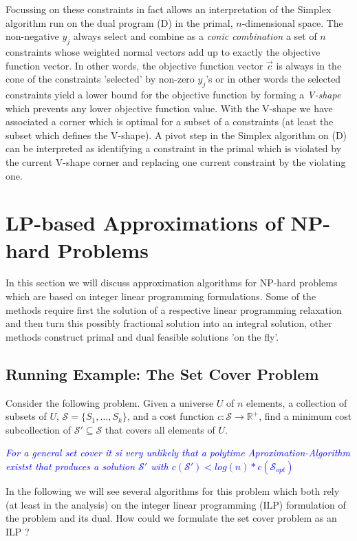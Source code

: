 \documentclass{article}
\begin{document}
Focussing on these constraints in fact allows an interpretation of the Simplex algorithm run on the dual program (D) in the primal, $n$-dimensional space. The non-negative $y_j$ always select and combine as a \emph{conic combination} a set of $n$ constraints whose weighted normal vectors add up to exactly the objective function vector. In other words, the objective function vector $\overrightarrow{c}$ is always in the cone of the constraints 'selected' by non-zero $y_j$'s or in other words the selected constraints yield a lower bound for the objective function by forming a \emph{V-shape} which prevents any lower objective function value. 
With the V-shape we have associated a corner which is optimal for a subset of a constraints (at least the subset which defines the V-shape). A pivot step in the Simplex algorithm on (D) can be interpreted as identifying a constraint in the primal which is violated by the current V-shape corner and replacing one current constraint by the violating one.


\newpage

\section{LP-based Approximations of NP-hard Problems}
In this section we will discuss approximation algorithms for NP-hard problems which are based on integer linear programming formulations. Some of the methods require first the solution of a respective linear programming relaxation and then turn this possibly fractional solution into an integral solution, other methods construct primal and dual feasible solutions 'on the fly'.
 
\subsection{Running Example: The Set Cover Problem}
Consider the following problem. Given a universe $U$ of $n$ elements, a collection of subsets of $U$,
$\mathcal{S}=\{S_1, \dots, S_k\}$, and a cost function $c: \mathcal{S} \rightarrow \mathbb{R}^+$, find a minimum cost
subcollection of $\mathcal{S}' \subseteq \mathcal{S}$ that covers all elements of $U$.

\textcolor{blue}{\emph{For a general set cover it si very unlikely that a polytime Aproximation-Algorithm existst that produces a solution $\mathcal{S}'$ with $c(\mathcal{S}') < log(n) * c(\mathcal{S}_{opt})$}}

In the following we will see several algorithms for this problem which both rely (at least in the analysis) on the
integer linear programming (ILP) formulation of the problem and its dual. How could we formulate the set cover problem 
as an ILP ?
\end{document}
